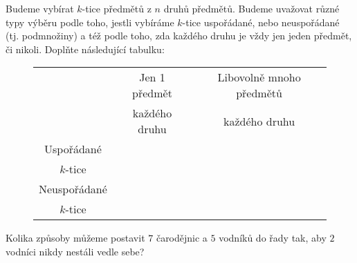 \begin{exercise}
 Budeme vybírat $k$-tice předmětů z $n$ druhů předmětů. Budeme uvažovat různé
 typy výběru podle toho, jestli vybíráme $k$-tice uspořádané, nebo neuspořádané
 (tj. podmnožiny) a též podle toho, zda každého druhu je vždy jen jeden předmět,
 či nikoli. Doplňte následující tabulku:
 \begin{figure}[H]
  \centering
  \begin{tabular}{c|c|c}
   & Jen 1 předmět & Libovolně mnoho předmětů\\
   & každého druhu & každého druhu\\
   \midrule
   Uspořádané& &\\
   $k$-tice& &\\
   \midrule
   Neuspořádané & &\\
   $k$-tice& &
  \end{tabular}
 \end{figure}
\end{exercise}

\begin{exercise}[těžké]
 Kolika způsoby můžeme postavit $7$ čarodějnic a $5$ vodníků do řady tak, aby
 $2$ vodníci nikdy nestáli vedle sebe?
\end{exercise}

